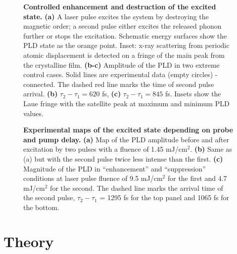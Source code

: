 \begin{figure}
\caption{\label{fig:Cr_experimental}{\bf Controlled enhancement and destruction of the excited state.} {\bf (a)} A laser pulse excites the system by destroying the magnetic order; a second pulse either excites the released phonon further or stops the excitation. Schematic energy surfaces show the PLD state as the orange point. Inset: x-ray scattering from periodic atomic displacement is detected on a fringe of the main peak from the crystalline film. {\bf (b-c)} Amplitude of the PLD in two extreme control cases. Solid lines are experimental data (empty circles) - connected. The dashed red line marks the time of second pulse arrival. {\bf (b)} $\tau_2 - \tau_1 = 620$ fs, {\bf (c)} $\tau_2 - \tau_1 = 845$ fs. Insets show the Laue fringe with the satellite peak at maximum and minimum PLD values.}
\end{figure}
\begin{figure}
\caption{\label{fig:Cr_experimental2}{\bf Experimental maps of the excited state depending on probe and pump delay.} { \bf (a)} Map of the PLD amplitude before and after excitation by two pulses with a fluence of 1.45 mJ/cm$^2$. {\bf (b)} Same as (a) but with the second pulse twice less intense than the first. {\bf (c)} Magnitude of the PLD in ``enhancement'' and ``suppression'' conditions at laser pulse fluence of 9.5 mJ/cm$^2$ for the first and 4.7 mJ/cm$^2$ for the second. The dashed line marks the arrival time of the second pulse, $\tau_2 - \tau_1$ = 1295 fs for the top panel and 1065 fs for the bottom.}
\end{figure}

\section{Theory}

